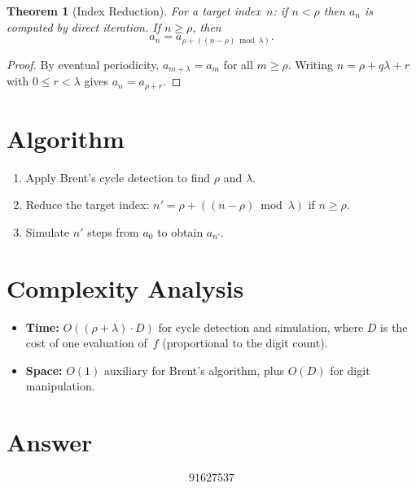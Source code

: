 \documentclass[11pt]{article}
\newtheorem{theorem}{Theorem}
\begin{document}
\begin{theorem}[Index Reduction]
For a target index~$n$: if $n < \rho$ then $a_n$ is computed by direct iteration. If $n \ge \rho$, then
\[
  a_n = a_{\rho + ((n - \rho) \bmod \lambda)}.
\]
\end{theorem}

\begin{proof}
By eventual periodicity, $a_{m + \lambda} = a_m$ for all $m \ge \rho$. Writing $n = \rho + q\lambda + r$ with $0 \le r < \lambda$ gives $a_n = a_{\rho + r}$.
\end{proof}

\section{Algorithm}

\begin{enumerate}
  \item Apply Brent's cycle detection to find $\rho$ and $\lambda$.
  \item Reduce the target index: $n' = \rho + ((n - \rho) \bmod \lambda)$ if $n \ge \rho$.
  \item Simulate $n'$ steps from $a_0$ to obtain $a_{n'}$.
\end{enumerate}

\section{Complexity Analysis}

\begin{itemize}
  \item \textbf{Time:} $O((\rho + \lambda) \cdot D)$ for cycle detection and simulation, where $D$ is the cost of one evaluation of~$f$ (proportional to the digit count).
  \item \textbf{Space:} $O(1)$ auxiliary for Brent's algorithm, plus $O(D)$ for digit manipulation.
\end{itemize}

\section{Answer}

\[
\boxed{91627537}
\]
\end{document}
